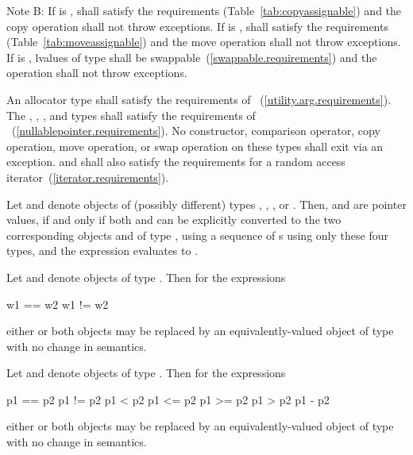 \pnum
Note B:
If  is ,
 shall satisfy the
 requirements (Table~\ref{tab:copyassignable})
and the copy operation shall not throw exceptions.
If  is ,
 shall satisfy the
 requirements (Table~\ref{tab:moveassignable})
and the move operation shall not throw exceptions.
If  is ,
lvalues of type  shall be swappable~(\ref{swappable.requirements})
and the  operation shall not throw exceptions.

\pnum
An allocator type  shall satisfy the requirements of
~(\ref{utility.arg.requirements}).
The , , , and
 types shall satisfy the requirements of
~(\ref{nullablepointer.requirements}).
No constructor,
comparison operator, copy operation, move operation, or swap operation on
these types shall exit via an exception.  and  shall also
satisfy the requirements for a random access
iterator~(\ref{iterator.requirements}).

\pnum
Let  and  denote objects of (possibly different) types
, , ,
or . Then,  and  are
 pointer values, if and only if both  and 
can be explicitly converted to the two corresponding objects  and 
of type , using a sequence of s
using only these four types, and the expression 
evaluates to .

\pnum
Let  and  denote objects of type .
Then for the expressions
\begin{codeblock}
w1 == w2
w1 != w2
\end{codeblock}
either or both objects may be replaced by an equivalently-valued object of type
 with no change in semantics.

\pnum
Let  and  denote objects of type .
Then for the expressions
\begin{codeblock}
p1 == p2
p1 != p2
p1 < p2
p1 <= p2
p1 >= p2
p1 > p2
p1 - p2
\end{codeblock}
either or both objects may be replaced by an equivalently-valued object of type
 with no change in semantics.

